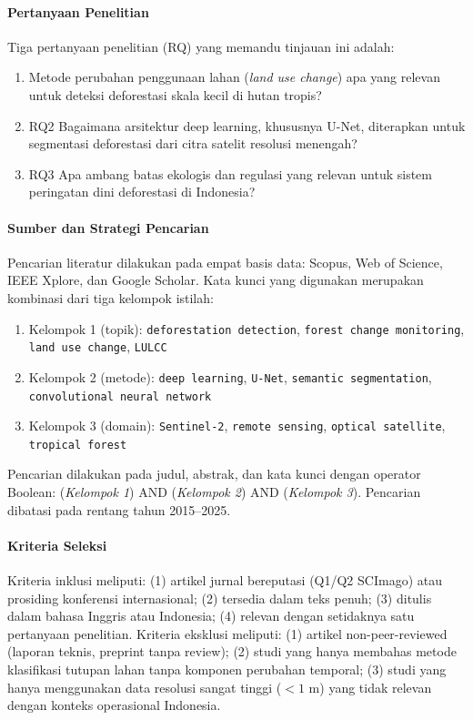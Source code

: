 \documentclass[12pt,a4paper]{article}
\begin{document}
\paragraph{Pertanyaan Penelitian}
Tiga pertanyaan penelitian (RQ) yang memandu tinjauan ini adalah:
\begin{enumerate}[nosep]
    \item[RQ1] Metode perubahan penggunaan lahan (\textit{land use
          change}) apa yang relevan untuk deteksi deforestasi skala
          kecil di hutan tropis?
    \item{RQ2} Bagaimana arsitektur deep learning, khususnya U-Net,
          diterapkan untuk segmentasi deforestasi dari citra
          satelit resolusi menengah?
    \item{RQ3} Apa ambang batas ekologis dan regulasi yang relevan
          untuk sistem peringatan dini deforestasi di Indonesia?
\end{enumerate}

\paragraph{Sumber dan Strategi Pencarian}
Pencarian literatur dilakukan pada empat basis data: Scopus,
Web of Science, IEEE Xplore, dan Google Scholar. Kata kunci
yang digunakan merupakan kombinasi dari tiga kelompok istilah:
\begin{enumerate}[nosep]
    \topsep=0pt
    \itemsep=0pt
    \item Kelompok 1 (topik): \texttt{deforestation detection},
          \texttt{forest change monitoring}, \texttt{land use
          change}, \texttt{LULCC}
    \item Kelompok 2 (metode): \texttt{deep learning},
          \texttt{U-Net}, \texttt{semantic segmentation},
          \texttt{convolutional neural network}
    \item Kelompok 3 (domain): \texttt{Sentinel-2}, \texttt{remote
          sensing}, \texttt{optical satellite}, \texttt{tropical
          forest}
\end{enumerate}
Pencarian dilakukan pada judul, abstrak, dan kata kunci dengan
operator Boolean: (\textit{Kelompok 1}) AND (\textit{Kelompok 2})
AND (\textit{Kelompok 3}). Pencarian dibatasi pada rentang
tahun 2015--2025.

\paragraph{Kriteria Seleksi}
Kriteria inklusi meliputi: (1) artikel jurnal bereputasi (Q1/Q2
SCImago) atau prosiding konferensi internasional; (2) tersedia
dalam teks penuh; (3) ditulis dalam bahasa Inggris atau Indonesia;
(4) relevan dengan setidaknya satu pertanyaan penelitian. Kriteria
eksklusi meliputi: (1) artikel non-peer-reviewed (laporan teknis,
preprint tanpa review); (2) studi yang hanya membahas metode
klasifikasi tutupan lahan tanpa komponen perubahan temporal;
(3) studi yang hanya menggunakan data resolusi sangat tinggi
($<1$ m) yang tidak relevan dengan konteks operasional Indonesia.
\end{document}
